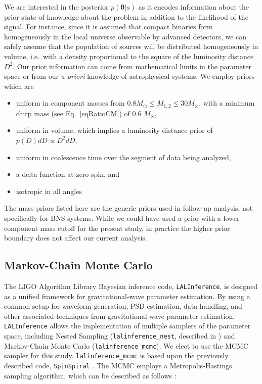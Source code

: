 \documentclass[11pt,a4paper]{emulateapj} 
\newcommand{\thpara}{\boldsymbol{\theta}}
\begin{document}
We are interested in the posterior $p(\thpara | s)$ as it encodes
information about the prior state of knowledge about the problem in
addition to the likelihood of the signal.  For instance, since it is
assumed that compact binaries form homogeneously in the local universe
observable by advanced detectors, we can safely assume that the
population of sources will be distributed homogeneously in volume, i.e.\
with a density proportional to the square of the luminosity distance $D^2$.  
Our prior information can come from mathematical limits in the parameter space 
or from our \textit{a priori} knowledge of astrophysical systems.  
We employ priors which are
\begin{itemize}
\item uniform in component masses from $0.8M_{\odot} \leq M_{1,2} \leq
  30M_{\odot}$, with a minimum chirp mass (see Eq.~\eqref{eqRatioCM})
  of 0.6 $M_{\odot}$,
\item uniform in volume, which implies a luminosity distance prior of
  $p(D)dD \propto D^2 dD$,
\item uniform in coalescence time over the segment of data being
  analyzed,
  \item a delta function at zero spin, and
\item isotropic in all angles
\end{itemize}
The mass priors listed here are the generic priors used in follow-up
analysis, not specifically for BNS systems.  While we could have used
a prior with a lower component mass cutoff for the present study, in
practice the higher prior boundary does not affect our current
analysis.


  
\subsection{Markov-Chain Monte Carlo}
\label{MCMCSection}
  
The LIGO Algorithm Library Bayesian inference code,
\texttt{LALInference}, is designed as a unified framework for
gravitational-wave parameter estimation.  By using a common setup for
waveform generation, PSD estimation, data handling, and other
associated techniques from gravitational-wave parameter estimation,
\texttt{LALInference} allows the implementation of multiple samplers
of the parameter space, including Nested Sampling
(\texttt{lalinference\_nest}, described in \cite{nestedsampling2010})
and Markov-Chain Monte Carlo (\texttt{lalinference\_mcmc}).  We elect
to use the MCMC sampler for this study.  \texttt{lalinference\_mcmc}
is based upon the previously described code, \texttt{SpinSpiral}
\citep{spinspiral2009, spinspiral2010}.  The MCMC employs a
Metropolis-Hastings sampling algorithm, which can be described as
follows \citep{Gilks99}:
  
\end{document}
